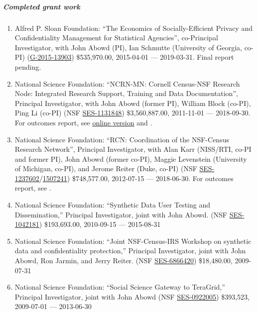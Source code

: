 \documentclass[10pt,letterpaper]{report}
\begin{document}
\subparagraph{Completed grant work}
\begin{enumerate}
	\item Alfred P. Sloan Foundation: ``The Economics of Socially-Efficient Privacy and Confidentiality Management for Statistical Agencies'', co-Principal Investigator, with John Abowd (PI), Ian Schmutte (University of Georgia, co-PI) (\href{https://sloan.org/grant-detail/6845}{G‐2015‐13903}) \$535,970.00, 2015-04-01 --- 2019-03-31. Final report pending.
	
	\item National Science Foundation: ``NCRN-MN: Cornell Census-NSF Research Node: Integrated Research Support, Training and Data Documentation'', Principal Investigator, with John Abowd (former PI), William Block (co-PI), Ping Li (co-PI) (NSF \href{http://www.nsf.gov/awardsearch/showAward.do?AwardNumber=1131848}{SES-1131848}) \$3,560,887.00, 2011-11-01 --- 2018-09-30. For outcomes report, see  \href{https://ncrncornell.github.io/reports/outcomes-report.html}{online version} and \cite{VilhuberBlock2019}.
	
	\item National Science Foundation: ``RCN: Coordination of the NSF-Census Research Network'', 
	Principal Investigator, with Alan Karr (NISS/RTI, co-PI and former PI), John Abowd (former co-PI), Maggie Levenstein (University of Michigan, co-PI), and 
	Jerome Reiter (Duke, 
	co-PI) (NSF \href{http://www.nsf.gov/awardsearch/showAward.do?AwardNumber=1237602}{SES-1237602}/\href{https://www.nsf.gov/awardsearch/showAward?AWD_ID=1507241}{1507241}) \$748,577.00, 2012-07-15 --- 2018-06-30. For outcomes report, see \cite{ncrn-summary}.
	
	\item National Science Foundation: ``Synthetic Data User Testing and Dissemination,'' Principal Investigator, joint with John Abowd. (NSF \href{http://www.nsf.gov/awardsearch/showAward.do?AwardNumber=1042181}{SES-1042181}) \$193,693.00, 2010-09-15 --- 2015-08-31
	
	\item National Science Foundation: ``Joint NSF-Census-IRS Workshop on
	synthetic data and confidentiality protection,'' Principal Investigator, joint with John Abowd,
	Ron Jarmin, and Jerry Reiter. (NSF \href{http://www.nsf.gov/awardsearch/showAward.do?AwardNumber=6866420}{SES-6866420}) \$18,480.00, 2009-07-31
	
	\item National Science Foundation: ``Social Science Gateway to TeraGrid,''
	Principal Investigator,  joint with John Abowd (NSF \href{http://www.nsf.gov/awardsearch/showAward.do?AwardNumber=0922005}{SES-0922005}) \$393,523,  2009-07-01 --- 2013-06-30
	

\end{enumerate}
\end{document}

